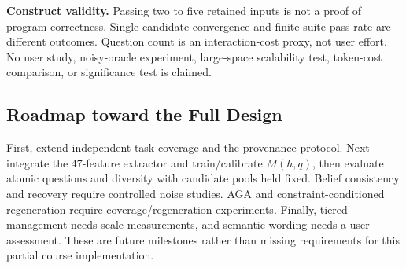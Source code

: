 \textbf{Construct validity.} Passing two to five retained inputs is not a proof of program correctness. Single-candidate convergence and finite-suite pass rate are different outcomes. Question count is an interaction-cost proxy, not user effort. No user study, noisy-oracle experiment, large-space scalability test, token-cost comparison, or significance test is claimed.

\subsection{Roadmap toward the Full Design}
First, extend independent task coverage and the provenance protocol. Next integrate the 47-feature extractor and train/calibrate $M(h,q)$, then evaluate atomic questions and diversity with candidate pools held fixed. Belief consistency and recovery require controlled noise studies. AGA and constraint-conditioned regeneration require coverage/regeneration experiments. Finally, tiered management needs scale measurements, and semantic wording needs a user assessment. These are future milestones rather than missing requirements for this partial course implementation.
